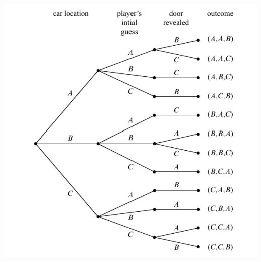\begin{frame}
      \begin{block}{}
        \begin{center}
          \includegraphics[scale=0.5]{fig173.pdf}
        \end{center}
      \end{block}
\end{frame}


